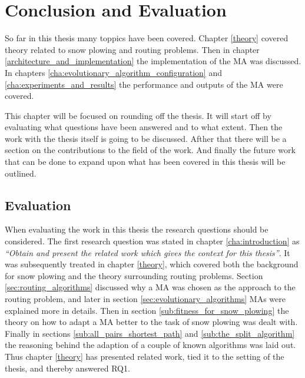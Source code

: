 \chapter{Conclusion and Evaluation}

So far in this thesis many toppics have been covered. Chapter \ref{theory} covered theory related to snow plowing and routing problems. Then in chapter \ref{architecture_and_implementation} the implementation of the MA was discussed. In chapters \ref{cha:evolutionary_algorithm_configuration} and \ref{cha:experiments_and_results} the performance and outputs of the MA were covered.

This chapter will be focused on rounding off the thesis. It will start off by evaluating what questions have been answered and to what extent. Then the work with the thesis itself is going to be discussed. Afther that there will be a section on the contributions to the field of the work. And finally the future work that can be done to expand upon what has been covered in this thesis will be outlined.

\section{Evaluation}



When evaluating the work in this thesis the research questions should be considered. The first research question was stated in chapter \ref{cha:introduction} as \emph{\enquote{Obtain and present the related work which gives the context for this thesis}}. It was subsequently treated in chapter \ref{theory}, which covered both the background for snow plowing and the theory surrounding routing problems. Section \ref{sec:routing_algorithms} discussed why a MA was chosen as the approach to the routing problem, and later in section \ref{sec:evolutionary_algorithms} MAs were explained more in details. Then in section \ref{sub:fitness_for_snow_plowing} the theory on how to adapt a MA better to the task of snow plowing was dealt with. Finally in sections \ref{sub:all_pairs_shortest_path} and \ref{sub:the_split_algorithm} the reasoning behind the adaption of a couple of known algorithms was laid out. Thus chapter \ref{theory} has presented related work, tied it to the setting of the thesis, and thereby answered RQ1.

